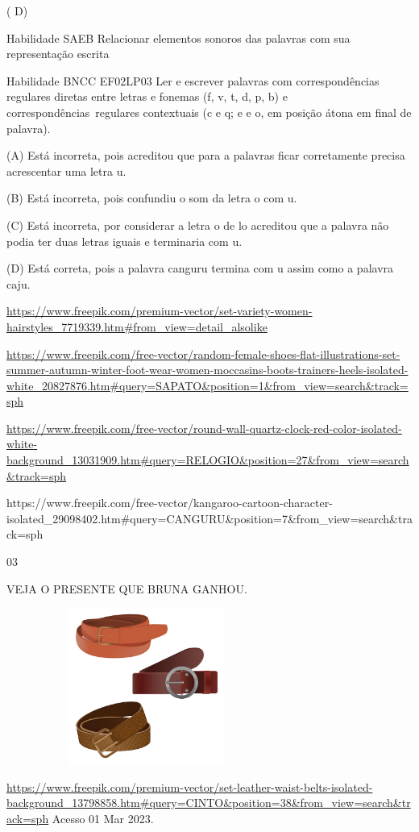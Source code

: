 {( D)

Habilidade SAEB Relacionar elementos sonoros das palavras com sua
representação escrita

Habilidade BNCC EF02LP03 Ler e escrever palavras com correspondências
regulares diretas entre letras e fonemas (f, v, t, d, p, b) e
correspondências~regulares contextuais (c e q; e e o, em posição átona
em final de palavra).

(A) Está incorreta, pois acreditou que para a palavras ficar
corretamente precisa acrescentar uma letra u.

(B) Está incorreta, pois confundiu o som da letra o com u.

(C) Está incorreta, por considerar a letra o de lo acreditou que a
palavra não podia ter duas letras iguais e terminaria com u.

(D) Está correta, pois a palavra canguru termina com u assim como a
palavra caju.

\url{https://www.freepik.com/premium-vector/set-variety-women-hairstyles_7719339.htm\#from_view=detail_alsolike}

\url{https://www.freepik.com/free-vector/random-female-shoes-flat-illustrations-set-summer-autumn-winter-foot-wear-women-moccasins-boots-trainers-heels-isolated-white_20827876.htm\#query=SAPATO\&position=1\&from_view=search\&track=sph}

\url{https://www.freepik.com/free-vector/round-wall-quartz-clock-red-color-isolated-white-background_13031909.htm\#query=RELOGIO\&position=27\&from_view=search\&track=sph}

https://www.freepik.com/free-vector/kangaroo-cartoon-character-isolated\_29098402.htm\#query=CANGURU\&position=7\&from\_view=search\&track=sph

\num{03}

VEJA O PRESENTE QUE BRUNA GANHOU.

\includegraphics[width=3.62413in,height=2.01875in]{media/image48.jpeg}

\url{https://www.freepik.com/premium-vector/set-leather-waist-belts-isolated-background_13798858.htm\#query=CINTO\&position=38\&from_view=search\&track=sph}
Acesso 01 Mar 2023.

}
